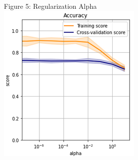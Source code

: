 \documentclass{article}
\begin{document}
\begin{figure}
\begin{subfigure}{.3\textwidth}
	\end{subfigure}
	\begin{subfigure}{.3\textwidth}
		\centering
		Figure 5: Regularization Alpha\\
		\includegraphics[width=\linewidth]{poland_nn_alpha_0_10_accuracy.png}
		
	\end{subfigure}
	\label{fig:test}
\end{figure}
\end{document}
